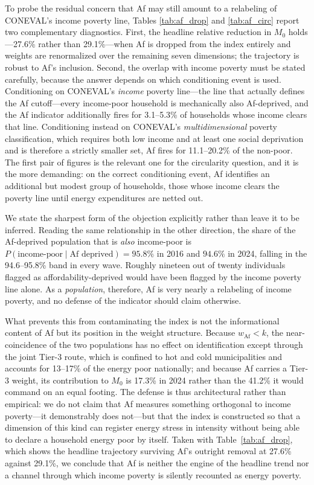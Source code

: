 \documentclass[11pt, a4paper]{article}
\begin{document}
To probe the residual concern that Af may still amount to a relabeling of CONEVAL's income poverty line, Tables \ref{tab:af_drop} and \ref{tab:af_circ} report two complementary diagnostics. First, the headline relative reduction in $M_0$ holds---27.6\% rather than 29.1\%---when Af is dropped from the index entirely and weights are renormalized over the remaining seven dimensions; the trajectory is robust to Af's inclusion. Second, the overlap with income poverty must be stated carefully, because the answer depends on which conditioning event is used. Conditioning on CONEVAL's \emph{income} poverty line---the line that actually defines the Af cutoff---every income-poor household is mechanically also Af-deprived, and the Af indicator additionally fires for 3.1--5.3\% of households whose income clears that line. Conditioning instead on CONEVAL's \emph{multidimensional} poverty classification, which requires both low income and at least one social deprivation and is therefore a strictly smaller set, Af fires for 11.1--20.2\% of the non-poor. The first pair of figures is the relevant one for the circularity question, and it is the more demanding: on the correct conditioning event, Af identifies an additional but modest group of households, those whose income clears the poverty line until energy expenditures are netted out.

We state the sharpest form of the objection explicitly rather than leave it to be inferred. Reading the same relationship in the other direction, the share of the Af-deprived population that is \emph{also} income-poor is $P(\text{income-poor} \mid \text{Af deprived}) = 95.8\%$ in 2016 and $94.6\%$ in 2024, falling in the 94.6--95.8\% band in every wave. Roughly nineteen out of twenty individuals flagged as affordability-deprived would have been flagged by the income poverty line alone. As a \emph{population}, therefore, Af is very nearly a relabeling of income poverty, and no defense of the indicator should claim otherwise.

What prevents this from contaminating the index is not the informational content of Af but its position in the weight structure. Because $w_{\mathrm{Af}} < k$, the near-coincidence of the two populations has no effect on identification except through the joint Tier-3 route, which is confined to hot and cold municipalities and accounts for 13--17\% of the energy poor nationally; and because Af carries a Tier-3 weight, its contribution to $M_0$ is 17.3\% in 2024 rather than the 41.2\% it would command on an equal footing. The defense is thus architectural rather than empirical: we do not claim that Af measures something orthogonal to income poverty---it demonstrably does not---but that the index is constructed so that a dimension of this kind can register energy stress in intensity without being able to declare a household energy poor by itself. Taken with Table~\ref{tab:af_drop}, which shows the headline trajectory surviving Af's outright removal at 27.6\% against 29.1\%, we conclude that Af is neither the engine of the headline trend nor a channel through which income poverty is silently recounted as energy poverty.
\end{document}
